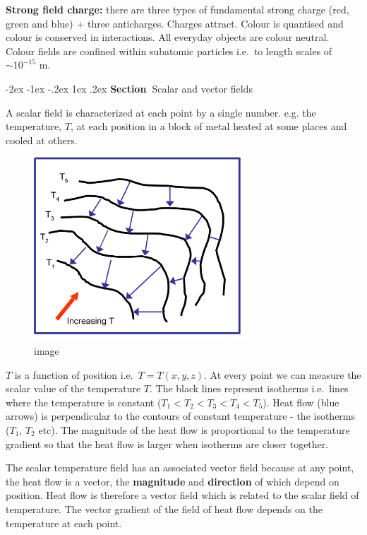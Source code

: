 \documentclass[
]{book}
\makeatletter
\renewcommand\section{%
\@startsection{section}{1}{\z@}%
              {-2ex \@plus -1ex \@minus -.2ex}%
              {1ex \@plus .2ex}%
              {\sffamily\bfseries\large\noindent Section~}}
\numberwithin{equation}{section}
\makeatother
\begin{document}
\textbf{Strong field charge:} there are three types of fundamental strong
charge (red, green and blue) + three anticharges. Charges attract.
Colour is quantised and colour is conserved in interactions. All
everyday objects are colour neutral. Colour fields are confined within
subatomic particles i.e.~to length scales of \(\sim 10^{-15}\) m.

\hypertarget{scalar-and-vector-fields}{%
\section{Scalar and vector fields}\label{scalar-and-vector-fields}}

A scalar field is characterized at each point by a single number. e.g.
the temperature, \(T\), at each position in a block of metal heated at
some places and cooled at others.

\begin{figure}
\centering
\includegraphics[width=80mm,height=\textheight]{Figures/isotherms.png}
\caption{image}
\end{figure}

\(T\) is a function of position i.e.~\(T = T(x,y,z)\). At every point we can
measure the scalar value of the temperature \(T\). The black lines
represent isotherms i.e.~lines where the temperature is constant
(\(T_1 < T_2 < T_3 < T_4 < T_5\)). Heat flow (blue arrows) is
perpendicular to the contours of constant temperature - the isotherms
(\(T_1\), \(T_2\) etc). The magnitude of the heat flow is proportional to
the temperature gradient so that the heat flow is larger when isotherms
are closer together.

The scalar temperature field has an associated vector field because at
any point, the heat flow is a vector, the \textbf{magnitude} and
\textbf{direction} of which depend on position. Heat flow is therefore a
vector field which is related to the scalar field of temperature. The
vector gradient of the field of heat flow depends on the temperature at
each point.
\end{document}
